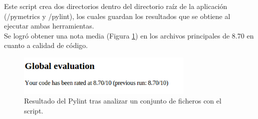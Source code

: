 

Este script crea dos directorios dentro  del directorio raíz de la aplicación (/pymetrics y /pylint), los cuales guardan los resultados que se obtiene al ejecutar ambas herramientas.\\

Se logró obtener una nota media (Figura \ref{fig:resultado}) en los archivos principales de 8.70 en cuanto a calidad de código.\\


\begin{figure}[H]
\begin{center}
\includegraphics[width=0.75\textwidth]{images/pylint.jpg}
\caption{Resultado del Pylint tras analizar un conjunto de ficheros con el script.}
\label{fig:resultado}
\end{center}
\end{figure}









